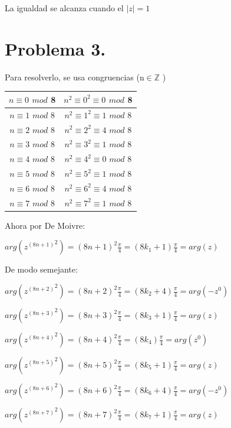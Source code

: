 \documentclass[11pt]{article}
\theoremstyle{Tema} \newtheorem{Tema}{Tema} %
\theoremstyle{Tema} \newtheorem{serie}{Serie}              %
\theoremstyle{Tema} \newtheorem{ejercicio}{Ejercicio}    %
\begin{document}
La igualdad se alcanza cuando el $|z|=1$





\section*{\textbf{Problema 3.} }

\begin{exercise}

Para resolverlo, se usa congruencias (n$ \in  \mathbb{Z}$ )
\begin{center}
\begin{tabular}{|c|c|}
		\hline
			$ n\equiv 0 $ $mod$ 8&$ n^2\equiv 0^2\equiv 0$ $ mod $ 8\\
		\hline
	$ n\equiv 1 $ $mod $ 8&$ n^2\equiv 1^2\equiv 1$ $ mod $ 8\\
	\hline
	$ n\equiv 2 $ $mod $ 8&$ n^2\equiv 2^2\equiv 4 $ $ mod $ 8\\
	\hline
	$ n\equiv 3 $ $mod $ 8&$ n^2\equiv 3^2\equiv 1$ $ mod $ 8\\
	\hline
	$ n\equiv 4 $ $mod$ 8&$ n^2\equiv 4^2\equiv 0$ $ mod $ 8\\
	\hline
	$ n\equiv 5 $ $mod $ 8&$ n^2\equiv 5^2\equiv 1$ $ mod $ 8\\
	\hline
	$ n\equiv 6 $ $mod $ 8&$ n^2\equiv 6^2\equiv 4 $ $ mod $ 8\\
	\hline
	$ n\equiv 7 $ $mod $ 8&$ n^2\equiv 7^2\equiv 1$ $ mod $ 8\\
	\hline


\end{tabular}
\end{center}

Ahora por De Moivre:

$ arg({z^{(8n+1)}}^2)= (8n+1)^2\frac{\pi}{4}= (8k_1+1)\frac{\pi}{4} =arg(z)$

De modo semejante:
\medskip

$ arg({z^{(8n+2)}}^2)=(8n+2)^2\frac{\pi}{4}= (8k_2+4)\frac{\pi}{4}= arg(-z^0)$

$ arg({z^{(8n+3)}}^2)=(8n+3)^2\frac{\pi}{4}= (8k_3+1)\frac{\pi}{4}=arg(z)$


$ arg({z^{(8n+4)}}^2)=(8n+4)^2\frac{\pi}{4}= (8k_4)\frac{\pi}{4}=arg(z^0)$

$ arg({z^{(8n+5)}}^2)=(8n+5)^2\frac{\pi}{4}= (8k_5+1)\frac{\pi}{4}= arg(z)$

$ arg({z^{(8n+6)}}^2)=(8n+6)^2\frac{\pi}{4}= (8k_6+4)\frac{\pi}{4}=arg(-z^0)$


$ arg({z^{(8n+7)}}^2)=(8n+7)^2\frac{\pi}{4}= (8k_7+1)\frac{\pi}{4}=arg(z)$


\end{exercise}
\end{document}
